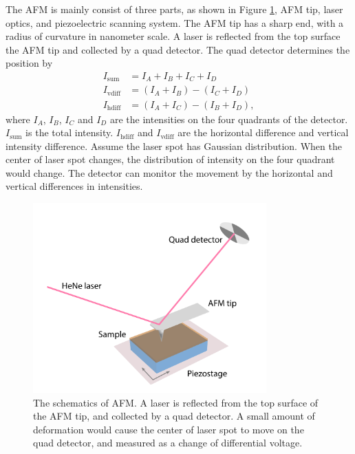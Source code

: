 \documentclass[pdflatex, sectionletters, 12pt]{pittetd}    %
\begin{document}
The AFM is mainly consist of three parts, as shown in Figure \ref{FIG:AFM}, AFM tip, laser optics, and piezoelectric scanning system. The AFM tip has a sharp end, with a radius of curvature in nanometer scale. A laser is reflected from the top surface the AFM tip and collected by a quad detector. The quad detector determines the position by
\begin{equation}
\begin{split}
I_\mathrm{sum} & = I_A + I_B + I_C + I_D \\ 
I_\mathrm{vdiff} & = (I_A + I_B) - (I_C + I_D) \\ 
I_\mathrm{hdiff} & = (I_A + I_C) - (I_B + I_D),
\end{split}
\end{equation}
where $I_A$, $I_B$, $I_C$ and $I_D$ are the intensities on the four quadrants of the detector. $I_\mathrm{sum}$ is the total intensity. $I_\mathrm{hdiff}$ and $I_\mathrm{vdiff}$ are the horizontal difference and vertical intensity difference. Assume the laser spot has Gaussian distribution. When the center of laser spot changes, the distribution of intensity on the four quadrant would change. The detector can monitor the movement by the horizontal and vertical differences in intensities. 

\begin{figure}[h!]
	\centering
	\includegraphics[width=0.8\textwidth]{Drawing/AFM.pdf}
	\caption{The schematics of AFM. A laser is reflected from the top surface of the AFM tip, and collected by a quad detector. A small amount of deformation would cause the center of laser spot to move on the quad detector, and measured as a change of differential voltage.}
	\label{FIG:AFM}
\end{figure}
\end{document}
